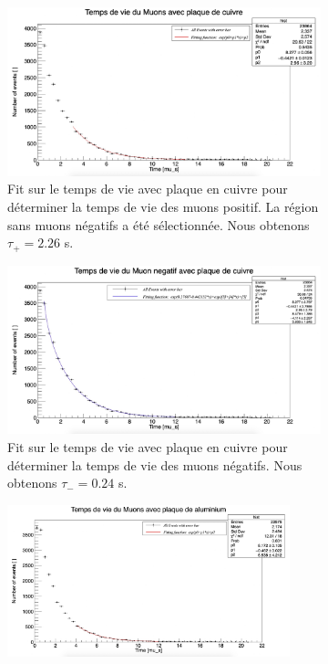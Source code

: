 \documentclass[12pt]{article}
\begin{document}
\begin{landscape}
\begin{figure}[htbp!] 
\centering  
    \begin{subfigure}[t]{.7\textwidth}
    \includegraphics[width=.9\textwidth]{Images/Photos/TauPlusCuivre.jpeg}
    \captionsetup{width=0.8\textwidth}
    \caption{Fit sur le temps de vie avec plaque en cuivre pour déterminer la temps de vie des muons positif. La région sans muons négatifs a été sélectionnée. Nous obtenons $\tau_{+}=2.26$ \SIUnitSymbolMicro s.}
    \label{fig:TauPlusCuivre}
    \end{subfigure}
    \begin{subfigure}[t]{.7\textwidth}
    \includegraphics[width=.9\textwidth]{Images/Photos/TauMoinsCuivre.jpeg}
    \captionsetup{width=0.8\textwidth}
    \caption{Fit sur le temps de vie avec plaque en cuivre pour déterminer la temps de vie des muons négatifs. Nous obtenons $\tau_{-}=0.24$ \SIUnitSymbolMicro s.}
    \label{fig:TauMoinsCuivre}
    \end{subfigure}
    \begin{subfigure}[t]{.7\textwidth}
    \includegraphics[width=0.9\textwidth]{Images/Photos/TauPlusAlu.jpeg}

\end{subfigure}
\end{figure}
\end{landscape}
\end{document}
